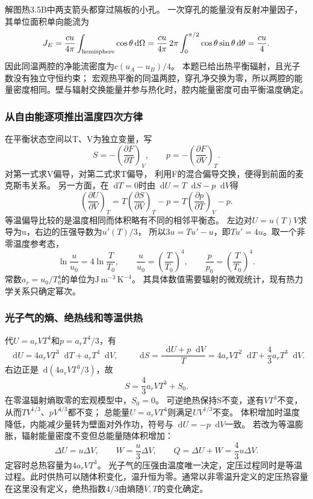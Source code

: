 \documentclass[UTF8,fontset=fandol,a4paper,11pt]{ctexart}
\newcommand{\dd}{\mathop{}\!\mathrm{d}}
\begin{document}
解图热3.5B中两支箭头都穿过隔板的小孔。
一次穿孔的能量没有反射冲量因子，其单位面积单向能流为
\[
J_E=\frac{cu}{4\pi}\int_{\rm hemisphere}\cos\theta\dd\Omega
=\frac{cu}{4\pi}\,2\pi\int_0^{\pi/2}\cos\theta\sin\theta\dd\theta
=\frac{cu}{4}.
\]
因此同温两腔的净能流密度为$c(u_A-u_B)/4$。
本题已给出热平衡辐射，且光子数没有独立守恒约束；
宏观热平衡的同温两腔，穿孔净交换为零，所以两腔的能量密度相同。壁与辐射交换能量并参与热化时，腔内能量密度可由平衡温度确定。

\subsubsection*{从自由能逐项推出温度四次方律}
在平衡状态空间以T、V为独立变量，写
\[
S=-\left(\frac{\partial F}{\partial T}\right)_V,\qquad
p=-\left(\frac{\partial F}{\partial V}\right)_T.
\]
对第一式求V偏导，对第二式求T偏导，
利用F的混合偏导交换，便得到前面的麦克斯韦关系。
另一方面，在$\dd T=0$时由$\dd U=T\dd S-p\dd V$得
\[
\left(\frac{\partial U}{\partial V}\right)_T
=T\left(\frac{\partial S}{\partial V}\right)_T-p
=T\left(\frac{\partial p}{\partial T}\right)_V-p.
\]
等温偏导比较的是温度相同而体积略有不同的相邻平衡态。
左边对$U=u(T)V$求导为u，右边的压强导数为$u'(T)/3$，
所以$3u=Tu'-u$，即$Tu'=4u$。取一个非零温度参考态，
\[
\ln\frac{u}{u_0}=4\ln\frac{T}{T_0},\qquad
\frac{u}{u_0}=\left(\frac{T}{T_0}\right)^4,\qquad
\frac{p}{p_0}=\left(\frac{T}{T_0}\right)^4.
\]
常数$a_r=u_0/T_0^4$的单位为$\mathrm{J\,m^{-3}\,K^{-4}}$。
其具体数值需要辐射的微观统计，现有热力学关系只确定幂次。

\subsubsection*{光子气的熵、绝热线和等温供热}
代$U=a_rVT^4$和$p=a_rT^4/3$，有
\[
\dd U=4a_rVT^3\dd T+a_rT^4\dd V,
\qquad
\dd S=\frac{\dd U+p\dd V}{T}
=4a_rVT^2\dd T+\frac43a_rT^3\dd V.
\]
右边正是$\dd(4a_rVT^3/3)$，故
\[
S=\frac43a_rVT^3+S_0.
\]
在零温辐射熵取零的宏观模型中，$S_0=0$。
可逆绝热保持S不变，遂有$VT^3$不变，
从而$TV^{1/3}$、$pV^{4/3}$都不变；
总能量$U=a_rVT^4$则满足$UV^{1/3}$不变。
体积增加时温度降低，内能减少量转为壁面对外作功，符号与$\dd U=-p\dd V$一致。
若改为等温膨胀，辐射能量密度不变但总能量随体积增加：
\[
\Delta U=u\Delta V,\qquad W=\frac u3\Delta V,\qquad
Q=\Delta U+W=\frac43u\Delta V.
\]
定容时总热容量为$4a_rVT^3$。
光子气的压强由温度唯一决定，定压过程同时是等温过程。此时供热可以随体积变化，温升恒为零。通常以非零温升定义的定压热容量在这里没有定义，绝热指数$4/3$由熵随$V,T$的变化确定。


\end{document}
